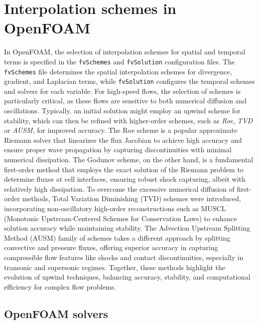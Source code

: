 \documentclass[a5paper]{sapthesis}
\begin{document}
	\section{Interpolation schemes in OpenFOAM}
	In OpenFOAM, the selection of interpolation schemes for spatial and temporal terms is specified in the \texttt{fvSchemes} and \texttt{fvSolution} configuration files. The \texttt{fvSchemes} file determines the spatial interpolation schemes for divergence, gradient, and Laplacian terms, while \texttt{fvSolution} configures the temporal schemes and solvers for each variable. For high-speed flows, the selection of schemes is particularly critical, as these flows are sensitive to both numerical diffusion and oscillations. Typically, an initial solution might employ an upwind scheme for stability, which can then be refined with higher-order schemes, such as \textit{Roe}\cite{ROE1981357}, \textit{TVD}\cite{HARTEN1983} or \textit{AUSM}\cite{LIOU_AUSM}, for improved accuracy. The Roe scheme is a popular approximate Riemann solver that linearizes the flux Jacobian to achieve high accuracy and ensure proper wave propagation by capturing discontinuities with minimal numerical dissipation. The Godunov scheme, on the other hand, is a fundamental first-order method that employs the exact solution of the Riemann problem to determine fluxes at cell interfaces, ensuring robust shock capturing, albeit with relatively high dissipation. To overcome the excessive numerical diffusion of first-order methods, Total Variation Diminishing (TVD) schemes were introduced, incorporating non-oscillatory high-order reconstructions such as MUSCL (Monotonic Upstream-Centered Schemes for Conservation Laws) to enhance solution accuracy while maintaining stability. The Advection Upstream Splitting Method (AUSM) family of schemes takes a different approach by splitting convective and pressure fluxes, offering superior accuracy in capturing compressible flow features like shocks and contact discontinuities, especially in transonic and supersonic regimes. Together, these methods highlight the evolution of upwind techniques, balancing accuracy, stability, and computational efficiency for complex flow problems.
	
	\subsection{OpenFOAM solvers}
		
\end{document}
